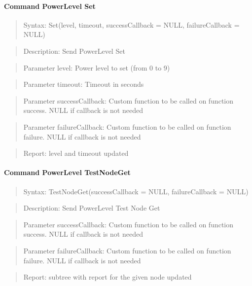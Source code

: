 \paragraph{Command PowerLevel Set}
\begin{quote}Syntax: Set(level, timeout, successCallback = NULL, failureCallback = NULL)\end{quote}
\begin{quote}Description: Send PowerLevel Set\end{quote}
\begin{quote}Parameter level: Power level to set (from 0 to 9)\end{quote}
\begin{quote}Parameter timeout: Timeout in seconds\end{quote}
\begin{quote}Parameter successCallback: Custom function to be called on function success. NULL if callback is not needed\end{quote}
\begin{quote}Parameter failureCallback: Custom function to be called on function failure. NULL if callback is not needed\end{quote}
\begin{quote}Report: level and timeout updated\end{quote}

\paragraph{Command PowerLevel TestNodeGet}
\begin{quote}Syntax: TestNodeGet(successCallback = NULL, failureCallback = NULL)\end{quote}
\begin{quote}Description: Send PowerLevel Test Node Get\end{quote}
\begin{quote}Parameter successCallback: Custom function to be called on function success. NULL if callback is not needed\end{quote}
\begin{quote}Parameter failureCallback: Custom function to be called on function failure. NULL if callback is not needed\end{quote}
\begin{quote}Report: subtree with report for the given node updated\end{quote}

